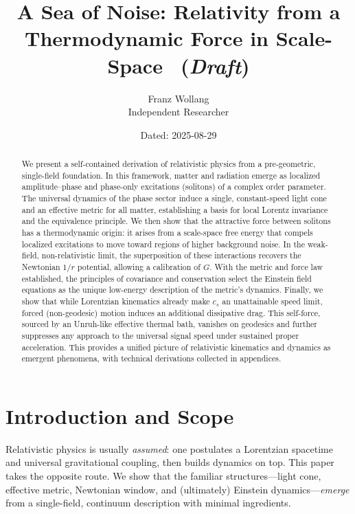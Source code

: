 \documentclass[11pt]{article}
\title{A Sea of Noise: Relativity from a Thermodynamic Force in Scale-Space \, (\textit{Draft})}
\author{Franz Wollang\\ \small Independent Researcher}
\date{\small Dated: 2025-08-29}
\begin{document}
\maketitle

\begin{center}
\setlength{\fboxsep}{8pt}%
\end{center}
\vspace{1em}

\begin{abstract}
We present a self-contained derivation of relativistic physics from a pre-geometric, single-field foundation. In this framework, matter and radiation emerge as localized amplitude--phase and phase-only excitations (solitons) of a complex order parameter. The universal dynamics of the phase sector induce a single, constant-speed light cone and an effective metric for all matter, establishing a basis for local Lorentz invariance and the equivalence principle. We then show that the attractive force between solitons has a thermodynamic origin: it arises from a scale-space free energy that compels localized excitations to move toward regions of higher background noise. In the weak-field, non-relativistic limit, the superposition of these interactions recovers the Newtonian $1/r$ potential, allowing a calibration of $G$. With the metric and force law established, the principles of covariance and conservation select the Einstein field equations as the unique low-energy description of the metric's dynamics. Finally, we show that while Lorentzian kinematics already make $c_s$ an unattainable speed limit, forced (non-geodesic) motion induces an additional dissipative drag. This self-force, sourced by an Unruh-like effective thermal bath, vanishes on geodesics and further suppresses any approach to the universal signal speed under sustained proper acceleration. This provides a unified picture of relativistic kinematics and dynamics as emergent phenomena, with technical derivations collected in appendices.
\end{abstract}

\section{Introduction and Scope}
Relativistic physics is usually \emph{assumed}: one postulates a Lorentzian spacetime and universal gravitational coupling, then builds dynamics on top. This paper takes the opposite route. We show that the familiar structures—light cone, effective metric, Newtonian window, and (ultimately) Einstein dynamics—\emph{emerge} from a single-field, continuum description with minimal ingredients.
\end{document}
